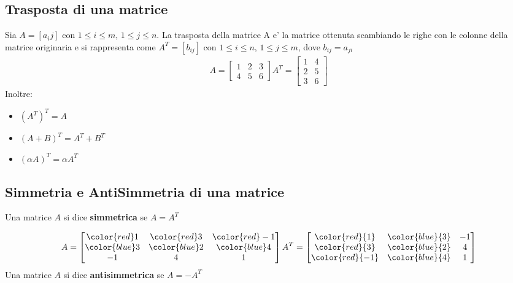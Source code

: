 \documentclass[a4paper, 10pt]{article}
\begin{document}
	\subsection{Trasposta di una matrice}
	Sia $A = [a_ij]$ con $1 \leq i \leq m$, $1 \leq j \leq n$. La trasposta della matrice A e' la matrice
	ottenuta scambiando le
	righe con le colonne della matrice originaria e si rappresenta come $A^T = [b_{ij}]$ con $1 \leq i \leq n$,
	$1 \leq j \leq m$, dove $b_{ij} = a_{ji}$
		\begin{align*}
			A = \begin{bmatrix}
				1 & 2 & 3 \\
				4 & 5 & 6
			\end{bmatrix}		
			A^T = \begin{bmatrix}
				1 & 4 \\
				2 & 5 \\
				3 & 6
			\end{bmatrix}
		\end{align*}
	Inoltre:
	\begin{itemize}
		\item $(A^T)^T = A$
		\item $(A + B)^T = A^T + B^T$
		\item $(\alpha A)^T = \alpha A^T$
	\end{itemize}
	
	\subsection{Simmetria e AntiSimmetria di una matrice}
	Una matrice $A$ si dice \textbf{simmetrica} se $A=A^T$ 

		\begin{align*}
			A = \begin{bmatrix}
					\color{red}1 & \color{red}3 & \color{red}-1 \\
					\color{blue}3 & \color{blue}2 & \color{blue} 4 \\
					 -1 & 4 & 1
 			\end{bmatrix}		
			A^T = \begin{bmatrix}
				\color{red}{1} & \color{blue}{3} & -1 \\
				\color{red}{3} & \color{blue}{2} &  4 \\
				\color{red}{-1} & \color{blue}{4} & 1
			\end{bmatrix}
		\end{align*} 
	Una matrice $A$ si dice \textbf{antisimmetrica} se $A=-A^T$ 
\end{document}
